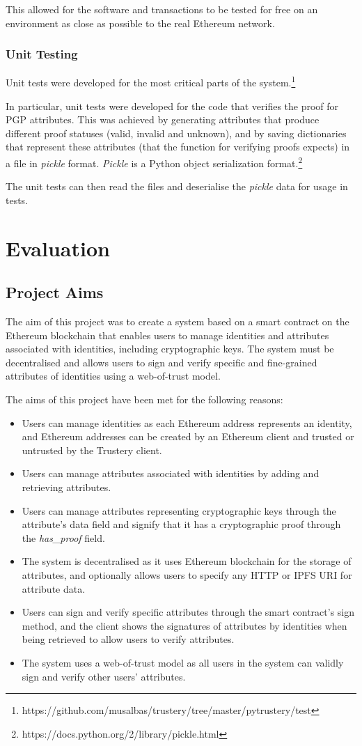 \documentclass[12pt]{report}
\begin{document}
	This allowed for the software and transactions to be tested for free on an environment as close as possible to the real Ethereum network.
	
	\subsection{Unit Testing}
	Unit tests were developed for the most critical parts of the system.\footnote{https://github.com/musalbas/trustery/tree/master/pytrustery/test}
	
	In particular, unit tests were developed for the code that verifies the proof for PGP attributes. This was achieved by generating attributes that produce different proof statuses (valid, invalid and unknown), and by saving dictionaries that represent these attributes (that the function for verifying proofs expects) in a file in \textit{pickle} format. \textit{Pickle} is a Python object serialization format.\footnote{https://docs.python.org/2/library/pickle.html}
	
	The unit tests can then read the files and deserialise the \textit{pickle} data for usage in tests.
	
	\chapter{Evaluation}
	\section{Project Aims}
	The aim of this project was to create a system based on a smart contract on the Ethereum blockchain that enables users to manage identities and attributes associated with identities, including cryptographic keys. The system must be decentralised and allows users to sign and verify specific and fine-grained attributes of identities using a web-of-trust model.
	
	The aims of this project have been met for the following reasons:
	\begin{itemize}
		\item Users can manage identities as each Ethereum address represents an identity, and Ethereum addresses can be created by an Ethereum client and trusted or untrusted by the Trustery client.
		\item Users can manage attributes associated with identities by adding and retrieving attributes.
		\item Users can manage attributes representing cryptographic keys through the attribute's data field and signify that it has a cryptographic proof through the \textit{has\_proof} field.
		\item The system is decentralised as it uses Ethereum blockchain for the storage of attributes, and optionally allows users to specify any HTTP or IPFS URI for attribute data.
		\item Users can sign and verify specific attributes through the smart contract's sign method, and the client shows the signatures of attributes by identities when being retrieved to allow users to verify attributes.
		\item The system uses a web-of-trust model as all users in the system can validly sign and verify other users' attributes.
	\end{itemize}
\end{document}
